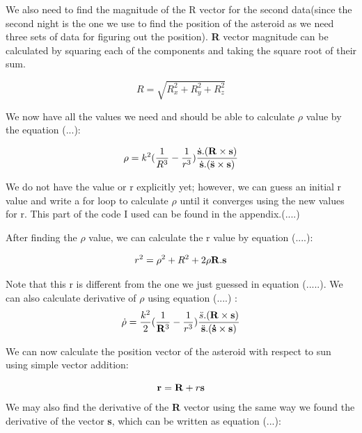 \documentclass[letterpaper,12pt]{article}
\begin{document}
We also need to find the magnitude of the R vector for the second data(since the second night is the one we use to find the position of the asteroid as we need three sets of data for figuring out the position). {\bf R} vector magnitude can be calculated by squaring each of the components and taking the square root of their sum.

\begin{equation}
R=\sqrt{R_{x}^2+R_{y}^2+R_{z}^2}
\end{equation}


We now have all the values we need and should be able to calculate \begin{math} \rho \end{math} value by the equation (...):

\begin{equation}
\rho=k^2(\frac{1}{R^3}-\frac{1}{r^3})\frac{\dot{{\bf s}}.({\bf R}\times{\bf s})}{\dot{{\bf s}}.(\ddot{{\bf s}}\times{\bf s})}
\end{equation}

We do not have the value or r explicitly yet; however, we can guess an initial r value and write a for loop to calculate \begin{math} \rho \end{math} until it converges using the new values for r. This part of the code I used can be found in the appendix.(....)


After finding the \begin{math} \rho \end{math} value, we can calculate the r value by equation (....):

\begin{equation}
r^2=\rho ^2 + R^2 + 2\rho {\bf R}. {\bf s}
\end{equation}

Note that this r is different from the one we just guessed in equation (.....). 
We can also calculate derivative of \begin{math} \rho \end{math} using equation (....) :
\begin{equation}
\dot{\rho}=\frac{k^2}{2}(\frac{1}{{\bf R}^3}-\frac{1}{r^3})\frac{\ddot{s}.({\bf R}\times {\bf s})}{\ddot{{\bf s}}.({\bf \dot{s}}\times {\bf s})}
\end{equation}

We can now calculate the position vector of the asteroid with respect to sun using simple vector addition:

\begin{equation}
{\bf r}= {\bf R}+r{\bf s}
\end{equation}
We may also find the derivative of the {\bf R} vector using the same way we found the derivative of the vector {\bf s}, which can be written as equation (...):
\end{document}
